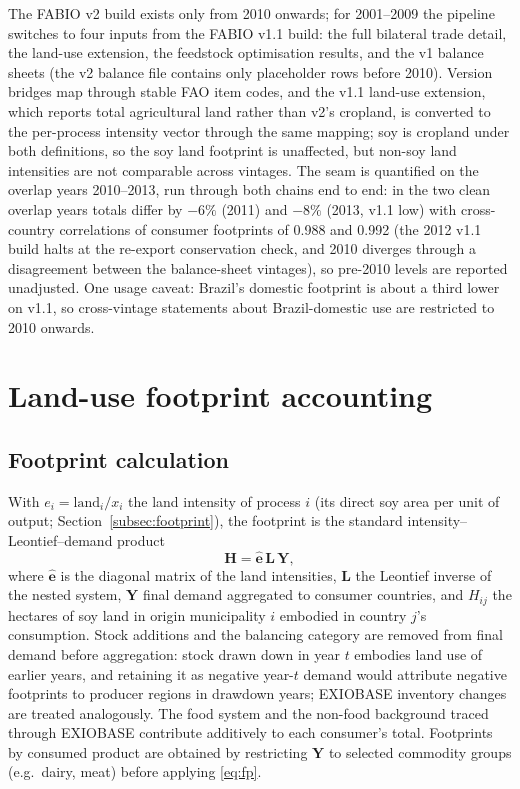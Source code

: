 The FABIO v2 build exists only from 2010 onwards; for 2001--2009 the
pipeline switches to four inputs from the FABIO v1.1 build: the full
bilateral trade detail, the land-use extension, the feedstock
optimisation results, and the v1 balance sheets (the v2 balance file
contains only placeholder rows before 2010). Version bridges map
through stable FAO item codes, and the v1.1 land-use extension, which
reports total agricultural land rather than v2's cropland, is
converted to the per-process intensity vector through the same
mapping; soy is cropland under both definitions, so the soy land
footprint is unaffected, but non-soy land intensities are not
comparable across vintages. The seam is quantified on the overlap
years 2010--2013, run through both chains end to end: in the two clean
overlap years totals differ by $-6\%$ (2011) and $-8\%$ (2013, v1.1
low) with cross-country correlations of consumer footprints of 0.988
and 0.992 (the 2012 v1.1 build halts at the re-export conservation
check, and 2010 diverges through a disagreement between the
balance-sheet vintages), so pre-2010 levels are reported unadjusted.
One usage caveat: Brazil's domestic footprint is about a third
lower on v1.1, so cross-vintage statements about Brazil-domestic use
are restricted to 2010 onwards.

\section{Land-use footprint accounting}\label{app:footprint}

\subsection{Footprint calculation}\label{subsubsec:stressor}
With $e_i=\text{land}_i/x_i$ the land intensity of process $i$ (its
direct soy area per unit of output; Section~\ref{subsec:footprint}), the
footprint is the standard intensity--Leontief--demand product
\begin{equation}\label{eq:fp}
  \mathbf{H}=\hat{\mathbf{e}}\,\mathbf{L}\,\mathbf{Y},
\end{equation}
where $\hat{\mathbf{e}}$ is the diagonal matrix of the land intensities,
$\mathbf{L}$ the Leontief inverse of the nested system, $\mathbf{Y}$ final
demand aggregated to consumer countries, and $H_{ij}$ the hectares of soy
land in origin municipality $i$ embodied in country $j$'s consumption.
Stock additions and the balancing category are removed from final demand
before aggregation: stock drawn down in year $t$ embodies land use of
earlier years, and retaining it as negative year-$t$ demand would
attribute negative footprints to producer regions in drawdown years;
EXIOBASE inventory changes are treated analogously. The
food system and the non-food background traced through EXIOBASE
\cite{stadler2018exiobase} contribute additively to each
consumer's total. Footprints by consumed product are obtained by
restricting $\mathbf{Y}$ to selected commodity groups (e.g.\ dairy, meat)
before applying \eqref{eq:fp}.

